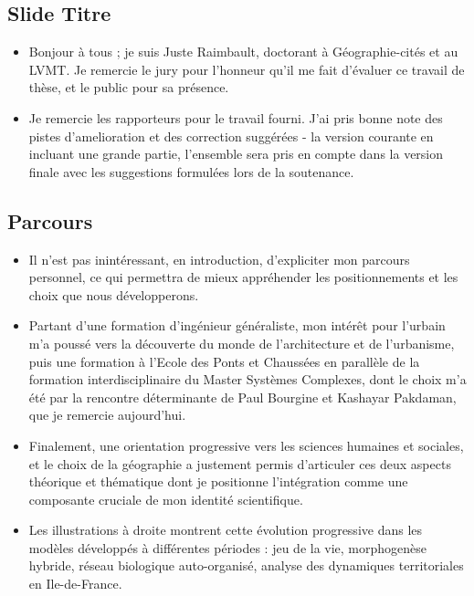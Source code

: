 \documentclass[11pt]{article}
\begin{document}
\subsection*{Slide Titre}

\begin{itemize}
	\item Bonjour à tous ; je suis Juste Raimbault, doctorant à Géographie-cités et au LVMT. Je remercie le jury pour l'honneur qu'il me fait d'évaluer ce travail de thèse, et le public pour sa présence.
	\item Je remercie les rapporteurs pour le travail fourni. J'ai pris bonne note des pistes d'amelioration et des correction suggérées - la version courante en incluant une grande partie, l'ensemble sera pris en compte dans la version finale avec les suggestions formulées lors de la soutenance.
\end{itemize}




\subsection*{Parcours}


\begin{itemize}
	\item Il n'est pas inintéressant, en introduction, d'expliciter mon parcours personnel, ce qui permettra de mieux appréhender les positionnements et les choix que nous développerons.
	\item Partant d'une formation d'ingénieur généraliste, mon intérêt pour l'urbain m'a poussé vers la découverte du monde de l'architecture et de l'urbanisme, puis une formation à l'Ecole des Ponts et Chaussées en parallèle de la formation interdisciplinaire du Master Systèmes Complexes, dont le choix m'a été par la rencontre déterminante de Paul Bourgine et Kashayar Pakdaman, que je remercie aujourd'hui.
	\item Finalement, une orientation progressive vers les sciences humaines et sociales, et le choix de la géographie a justement permis d'articuler ces deux aspects théorique et thématique dont je positionne l'intégration comme une composante cruciale de mon identité scientifique.
	\item Les illustrations à droite montrent cette évolution progressive dans les modèles développés à différentes périodes : jeu de la vie, morphogenèse hybride, réseau biologique auto-organisé, analyse des dynamiques territoriales en Ile-de-France.
\end{itemize}
\end{document}

